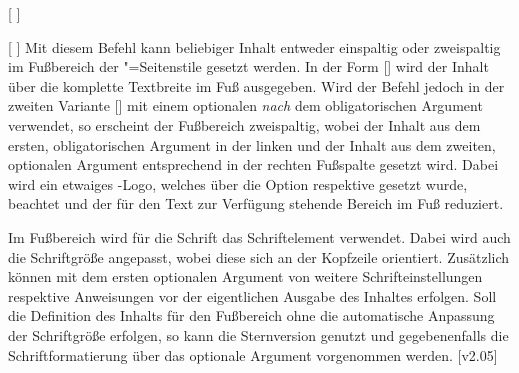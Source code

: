 \begin{Declaration*}{}
\begin{Declaration*}{}
\begin{Declaration*}{}
\begin{Declaration}[v2.04]{%
  [%
  ]%
}
\begin{Declaration}[v2.04]{%
  [%
  ]%
}
\printdeclarationlist%
%
%
Mit diesem Befehl kann beliebiger Inhalt entweder einspaltig oder zweispaltig 
im Fußbereich der "=Seitenstile gesetzt werden. In der 
Form [] wird der Inhalt über die komplette 
Textbreite im Fuß ausgegeben. Wird der Befehl jedoch in der zweiten Variante 
[] mit 
einem optionalen \emph{nach} dem obligatorischen Argument verwendet, so 
erscheint der Fußbereich zweispaltig, wobei der Inhalt aus dem ersten, 
obligatorischen Argument in der linken und der Inhalt aus dem zweiten, 
optionalen Argument entsprechend in der rechten Fußspalte gesetzt wird. Dabei 
wird ein etwaiges \DDC-Logo, welches über die Option  respektive
 gesetzt wurde, beachtet und der für den Text zur Verfügung 
stehende Bereich im Fuß reduziert.

Im Fußbereich wird für die Schrift das Schriftelement   
verwendet. Dabei wird auch die Schriftgröße angepasst, wobei diese sich an der 
Kopfzeile orientiert. Zusätzlich können mit dem ersten optionalen Argument von 
 weitere Schrifteinstellungen respektive Anweisungen vor der 
eigentlichen Ausgabe des Inhaltes erfolgen. Soll die Definition des Inhalts für 
den Fußbereich ohne die automatische Anpassung der Schriftgröße erfolgen, so 
kann die Sternversion  genutzt und gegebenenfalls die 
Schriftformatierung über das optionale Argument vorgenommen werden.
[v2.05]
\end{Declaration}
\end{Declaration}


\end{Declaration*}
\end{Declaration*}
\end{Declaration*}
